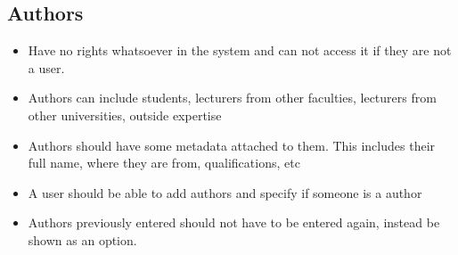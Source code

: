 \documentclass[12pt, letterpaper, twoside]{article}
\begin{document}
 \subsection{Authors}
 \begin{itemize}  

    \item Have no rights whatsoever in the system and can not access it if they are not a user.

    \item Authors can include students, lecturers from other faculties, lecturers from other universities, outside expertise
    
    \item Authors should have some metadata attached to them. This includes their full name, where they are from, qualifications, etc
    \item A user should be able to add authors and specify if someone is a author
    \item Authors previously entered should not have to be entered again, instead be shown as an option.

\end{itemize}
\end{document}
